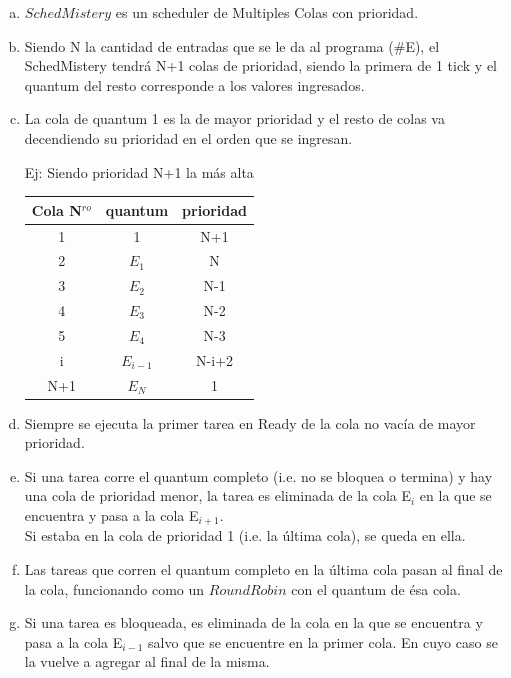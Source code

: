 \begin{enumerate}[(a)]

\item $SchedMistery$ es un scheduler de Multiples Colas con prioridad.

\item Siendo N la cantidad de entradas que se le da al programa (\#E), el SchedMistery tendr\'a N+1 colas de prioridad, siendo la primera de 1 tick y el quantum del resto corresponde a los valores ingresados.

\item La cola de quantum 1 es la de mayor prioridad y el resto de colas va decendiendo su prioridad en el orden que se ingresan.

Ej: Siendo prioridad N+1 la m\'as alta
\begin{table}[H]
\centering
\begin{tabular}{ | c | c | c |}
  \hline			
  Cola N$^{ro}$ & quantum & prioridad\\
  \hline
1 	& 1 			& N+1\\
2 	& $E_1$ 		& N\\
3 	& $E_2$ 		& N-1\\
4 	& $E_3$ 		& N-2\\
5 	& $E_4$ 		& N-3\\
  \hline
i 	& $E_{i-1}$ 	& N-i+2\\
  \hline
N+1 & $E_N$ 		& 1\\
  \hline

\end{tabular}
\end{table}

\item Siempre se ejecuta la primer tarea en Ready de la cola no vac\'ia de mayor prioridad.

\item Si una tarea corre el quantum completo (i.e. no se bloquea o termina) y hay una cola de prioridad menor, la tarea es eliminada de la cola E$_i$ en la que se encuentra y pasa a la cola E$_{i+1}$.\\
	Si estaba en la cola de prioridad 1 (i.e. la \'ultima cola), se queda en ella.
	
\item Las tareas que corren el quantum completo en la \'ultima cola pasan al final de la cola, funcionando como un $Round Robin$ con el quantum de \'esa cola.
	
\item Si una tarea es bloqueada, es eliminada de la cola en la que se encuentra y pasa a la cola E$_{i-1}$ salvo que se encuentre en la primer cola. En cuyo caso se la vuelve a agregar al final de la misma.

\end{enumerate}

